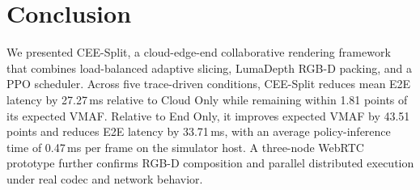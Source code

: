 \documentclass[10pt,journal,compsoc]{IEEEtran}
\begin{document}
\section{Conclusion}
\label{sec:conclusion}

We presented CEE-Split, a cloud-edge-end collaborative rendering framework that combines load-balanced adaptive slicing, LumaDepth RGB-D packing, and a PPO scheduler. Across five trace-driven conditions, CEE-Split reduces mean E2E latency by 27.27\,ms relative to Cloud Only while remaining within 1.81 points of its expected VMAF. Relative to End Only, it improves expected VMAF by 43.51 points and reduces E2E latency by 33.71\,ms, with an average policy-inference time of 0.47\,ms per frame on the simulator host. A three-node WebRTC prototype further confirms RGB-D composition and parallel distributed execution under real codec and network behavior.



\end{document}
